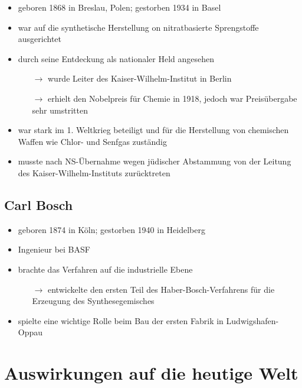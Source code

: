 \documentclass[11pt]{article}
\begin{document}
\begin{itemize}
    \item geboren 1868 in Breslau, Polen; gestorben 1934 in Basel
    \item war auf die synthetische Herstellung on nitratbasierte Sprengstoffe ausgerichtet
    \item durch seine Entdeckung als nationaler Held angesehen
    \begin{itemize}
        \item[$\rightarrow$] wurde Leiter des Kaiser-Wilhelm-Institut in Berlin
        \item[$\rightarrow$] erhielt den Nobelpreis für Chemie in 1918, jedoch war Preisübergabe sehr umstritten
    \end{itemize}
    \item war stark im 1. Weltkrieg beteiligt und für die Herstellung von chemischen Waffen wie Chlor- und Senfgas zuständig
    \item musste nach NS-Übernahme wegen jüdischer Abstammung von der Leitung des Kaiser-Wilhelm-Instituts zurücktreten
\end{itemize}

\subsection*{Carl Bosch}
\begin{itemize}
    \item geboren 1874 in Köln; gestorben 1940 in Heidelberg
    \item Ingenieur bei BASF
    \item brachte das Verfahren auf die industrielle Ebene
    \begin{itemize}
        \item[$\rightarrow$] entwickelte den ersten Teil des Haber-Bosch-Verfahrens für die Erzeugung des Synthesegemisches
    \end{itemize}
    \item spielte eine wichtige Rolle beim Bau der ersten Fabrik in Ludwigshafen-Oppau
\end{itemize}    

\section*{Auswirkungen auf die heutige Welt}
  
\end{document}

